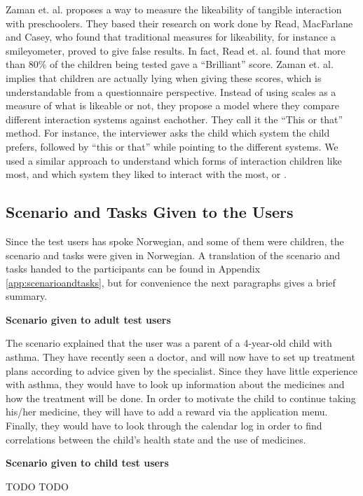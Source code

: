 Zaman et. al. proposes a way to measure the likeability of tangible interaction with preschoolers\cite{zaman2007measure}. They based their research on work done by Read, MacFarlane and Casey\cite{read2002endurability}, who found that traditional measures for likeability, for instance a smileyometer, proved to give false results. In fact, Read et. al. found that more than 80\% of the children being tested gave a ``Brilliant'' score. Zaman et. al. implies that children are actually lying when giving these scores, which is understandable from a questionnaire perspective. Instead of using scales as a measure of what is likeable or not, they propose a model where they compare different interaction systems against eachother. They call it the ``This or that'' method\cite{zaman2007measure}. For instance, the interviewer asks the child which system the child prefers, followed by ``this or that'' while pointing to the different systems. We used a similar approach to understand which forms of interaction children like most, and which system they liked to interact with the most, \app{} or \ab{}.   


\subsection{Scenario and Tasks Given to the Users}
\label{sec:scenarioandtasksgiventotheusers}
Since the test users has spoke Norwegian, and some of them were children, the scenario and tasks were given in Norwegian. A translation of the scenario and tasks handed to the participants can be found in Appendix \ref{app:scenarioandtasks}, but for convenience the next paragraphs gives a brief summary.

\textbf{Scenario given to adult test users}

The scenario explained that the user was a parent of a 4-year-old child with asthma. They have recently seen a doctor, and will now have to set up treatment plans according to advice given by the specialist. Since they have little experience with asthma, they would have to look up information about the medicines and how the treatment will be done. In order to motivate the child to continue taking his/her medicine, they will have to add a reward via the application menu. Finally, they would have to look through the calendar log in order to find correlations between the child's health state and the use of medicines. 


\textbf{Scenario given to child test users}

TODO TODO